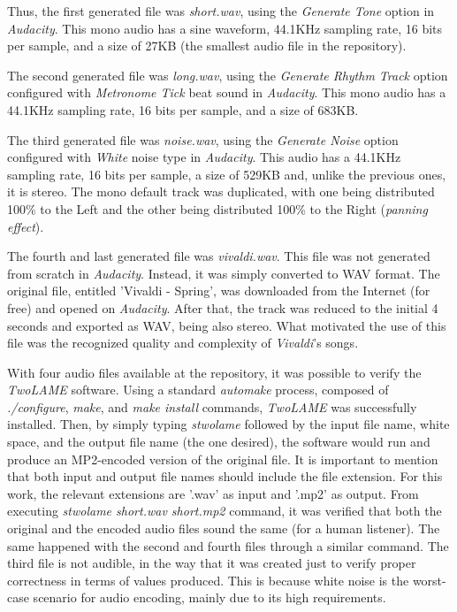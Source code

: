 Thus, the first generated file was \textit{short.wav}, using the \textit{Generate Tone} option in \textit{Audacity}. This mono audio has a sine waveform, 44.1KHz sampling rate, 16 bits per sample, and a size of 27KB (the smallest audio file in the repository).

The second generated file was \textit{long.wav}, using the \textit{Generate Rhythm Track} option configured with \textit{Metronome Tick} beat sound in \textit{Audacity}. This mono audio has a 44.1KHz sampling rate, 16 bits per sample, and a size of 683KB.

The third generated file was \textit{noise.wav}, using the \textit{Generate Noise} option configured with \textit{White} noise type in \textit{Audacity}. This audio has a 44.1KHz sampling rate, 16 bits per sample, a size of 529KB and, unlike the previous ones, it is stereo. The mono default track was duplicated, with one being distributed 100\% to the Left and the other being distributed 100\% to the Right (\textit{panning effect}).

The fourth and last generated file was \textit{vivaldi.wav}. This file was not generated from scratch in \textit{Audacity}. Instead, it was simply converted to WAV format. The original file, entitled 'Vivaldi - Spring', was downloaded from the Internet (for free) and opened on \textit{Audacity}. After that, the track was reduced to the initial 4 seconds and exported as WAV, being also stereo. What motivated the use of this file was the recognized quality and complexity of \textit{Vivaldi}'s songs.

With four audio files available at the repository, it was possible to verify the \textit{TwoLAME} software. Using a standard \textit{automake} process, composed of \textit{./configure}, \textit{make}, and \textit{make install} commands, \textit{TwoLAME} was successfully installed. Then, by simply typing \textit{stwolame} followed by the input file name, white space, and the output file name (the one desired), the software would run and produce an MP2-encoded version of the original file.
It is important to mention that both input and output file names should include the file extension. For this work, the relevant extensions are '.wav' as input and '.mp2' as output.
From executing \textit{stwolame short.wav short.mp2} command, it was verified that both the original and the encoded audio files sound the same (for a human listener). The same happened with the second and fourth files through a similar command. 
The third file is not audible, in the way that it was created just to verify proper correctness in terms of values produced. This is because white noise is the worst-case scenario for audio encoding, mainly due to its high requirements. \\


